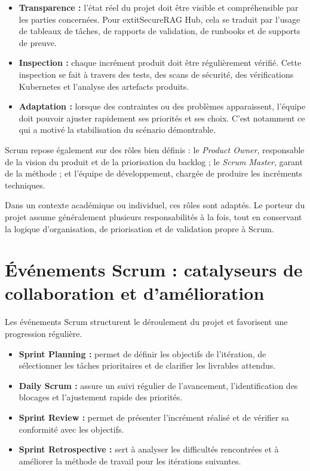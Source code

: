 \begin{itemize}
    \item \textbf{Transparence :} l’état réel du projet doit être visible et compréhensible par les parties concernées. Pour 	extit{SecureRAG Hub}, cela se traduit par l’usage de tableaux de tâches, de rapports de validation, de runbooks et de supports de preuve.
    \item \textbf{Inspection :} chaque incrément produit doit être régulièrement vérifié. Cette inspection se fait à travers des tests, des scans de sécurité, des vérifications Kubernetes et l’analyse des artefacts produits.
    \item \textbf{Adaptation :} lorsque des contraintes ou des problèmes apparaissent, l’équipe doit pouvoir ajuster rapidement ses priorités et ses choix. C’est notamment ce qui a motivé la stabilisation du scénario démontrable.
\end{itemize}

Scrum repose également sur des rôles bien définis : le \textit{Product Owner}, responsable de la vision du produit et de la priorisation du backlog ; le \textit{Scrum Master}, garant de la méthode ; et l’équipe de développement, chargée de produire les incréments techniques.

Dans un contexte académique ou individuel, ces rôles sont adaptés. Le porteur du projet assume généralement plusieurs responsabilités à la fois, tout en conservant la logique d’organisation, de priorisation et de validation propre à Scrum.

\section{Événements Scrum : catalyseurs de collaboration et d’amélioration}

Les événements Scrum structurent le déroulement du projet et favorisent une progression régulière.

\begin{itemize}
    \item \textbf{Sprint Planning :} permet de définir les objectifs de l’itération, de sélectionner les tâches prioritaires et de clarifier les livrables attendus.
    \item \textbf{Daily Scrum :} assure un suivi régulier de l’avancement, l’identification des blocages et l’ajustement rapide des priorités.
    \item \textbf{Sprint Review :} permet de présenter l’incrément réalisé et de vérifier sa conformité avec les objectifs.
    \item \textbf{Sprint Retrospective :} sert à analyser les difficultés rencontrées et à améliorer la méthode de travail pour les itérations suivantes.
\end{itemize}

